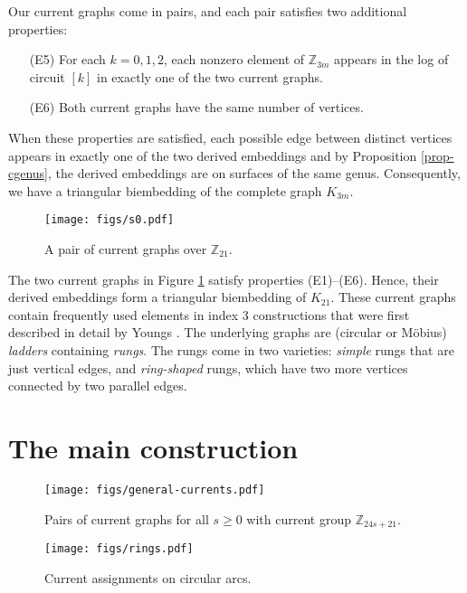 \documentclass[12pt]{article}
\theoremstyle{plain}
\newcommand{\Z}{\mathbb{Z}}
\begin{document}
Our current graphs come in pairs, and each pair satisfies two additional properties:

\begin{itemize}
\item[(E5)] For each $k = 0, 1, 2$, each nonzero element of $\Z_{3m}$ appears in the log of circuit $[k]$ in exactly one of the two current graphs. 
\item[(E6)] Both current graphs have the same number of vertices.
\end{itemize}

When these properties are satisfied, each possible edge between distinct vertices appears in exactly one of the two derived embeddings and by Proposition \ref{prop-cgenus}, the derived embeddings are on surfaces of the same genus. Consequently, we have a triangular biembedding of the complete graph $K_{3m}$. 

\begin{figure}[!t]
\centering
\texttt{[image: figs/s0.pdf]}
\caption{A pair of current graphs over $\mathbb{Z}_{21}$.}
\label{fig-s0}
\end{figure}

The two current graphs in Figure \ref{fig-s0} satisfy properties (E1)--(E6). Hence, their derived embeddings form a triangular biembedding of $K_{21}$. These current graphs contain frequently used elements in index 3 constructions that were first described in detail by Youngs \cite{Youngs-3569}. The underlying graphs are (circular or M\"obius) \emph{ladders} containing \emph{rungs}. The rungs come in two varieties: \emph{simple} rungs that are just vertical edges, and \emph{ring-shaped} rungs, which have two more vertices connected by two parallel edges. 

\section{The main construction}

\begin{figure}[!t]
\centering
\texttt{[image: figs/general-currents.pdf]}
\caption{Pairs of current graphs for all $s \geq 0$ with current group $\mathbb{Z}_{24s+21}$.}
\label{fig-general}
\end{figure}

\begin{figure}[!t]
\centering
\texttt{[image: figs/rings.pdf]}
\caption{Current assignments on circular arcs.}
\label{fig-rings}
\end{figure}
\end{document}
